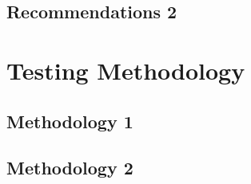 \documentclass[12pt, table,dvipsnames]{article}
\begin{document}
\lipsum[1]

\subsection{Recommendations 2}

\lipsum[3-4]


\section{Testing Methodology}
\subsection{Methodology 1}
\lipsum[1]

\subsection{Methodology 2}
\lipsum[1]

\newpage
\end{document}
